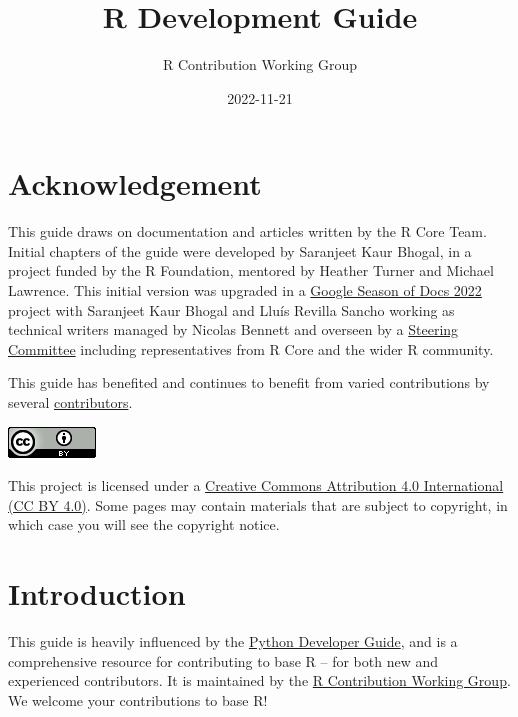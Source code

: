\documentclass[
]{book}
\title{R Development Guide}
\author{R Contribution Working Group}
\date{2022-11-21}
\begin{document}
\maketitle

{
\setcounter{tocdepth}{1}
\tableofcontents
}
\hypertarget{acknowledgement}{%
\chapter{Acknowledgement}\label{acknowledgement}}

This guide draws on documentation and articles written by the R Core Team.
Initial chapters of the guide were developed by Saranjeet Kaur Bhogal, in a project funded by the R Foundation, mentored by Heather Turner and Michael Lawrence. This initial version was upgraded in a \href{https://github.com/rstats-gsod/gsod2022/wiki/GSOD-2022-Proposal}{Google Season of Docs 2022} project with Saranjeet Kaur Bhogal and Lluís Revilla Sancho working as technical writers managed by Nicolas Bennett and overseen by a \href{https://github.com/rstats-gsod/gsod2022/wiki/GSOD-2022-Proposal\#steering-committee}{Steering Committee} including representatives from R Core and the wider R community.

This guide has benefited and continues to benefit from varied contributions by several \href{https://github.com/r-devel/rdevguide\#contributors-}{contributors}.

\href{https://creativecommons.org/licenses/by/4.0/}{\includegraphics{img/ccby.png}}

This project is licensed under a \href{https://creativecommons.org/licenses/by/4.0/}{Creative Commons Attribution 4.0 International (CC BY 4.0)}. Some pages may contain materials that are subject to copyright, in which case you will see the copyright notice.

\hypertarget{introduction}{%
\chapter{Introduction}\label{introduction}}

This guide is heavily influenced by the \href{https://devguide.python.org/}{Python Developer Guide}, and is a comprehensive resource for contributing to base R -- for both new and experienced contributors. It is maintained by the \href{/working-group}{R Contribution Working Group}. We welcome your contributions to base R!
\end{document}
